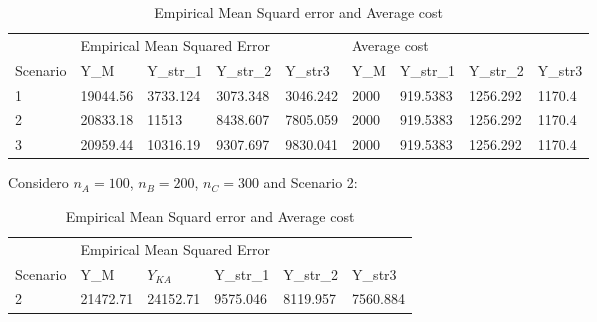 \documentclass[11pt,a4paper]{article}
\begin{document}
\begin{table}[]
\centering
\caption{Empirical Mean Squard error and Average cost}
\label{my-label}
\begin{tabular}{|l|llll|llll|}
\hline
  & \multicolumn{4}{l}{Empirical Mean Squared Error} & \multicolumn{4}{l}{Average cost}        \\
Scenario  & Y\_M    & Y\_str\_1  & Y\_str\_2  & Y\_str3   & Y\_M & Y\_str\_1 & Y\_str\_2 & Y\_str3  \\
\hline
1 & 19044.56 & 3733.124 & 3073.348 & 3046.242 & 2000 & 919.5383 & 1256.292 & 1170.4\\
2 & 20833.18 & 11513    & 8438.607 & 7805.059 & 2000 & 919.5383 & 1256.292 & 1170.4\\
3 & 20959.44 & 10316.19 & 9307.697 & 9830.041 & 2000 & 919.5383 & 1256.292 & 1170.4\\
\hline
\end{tabular}
\end{table}


Considero $n_A = 100$, $n_B = 200$, $n_C = 300$ and Scenario 2:

\begin{table}[]
\centering
\caption{Empirical Mean Squard error and Average cost}
\label{my-label}
\begin{tabular}{|l|lllll|}
\hline
  & \multicolumn{5}{l}{Empirical Mean Squared Error}         \\
Scenario  & Y\_M    & $Y_{KA}$ & Y\_str\_1  & Y\_str\_2  & Y\_str3 \\
\hline
2 & 21472.71 & 24152.71 & 9575.046 & 8119.957 & 7560.884 \\
\hline
\end{tabular}
\end{table}
\end{document}
